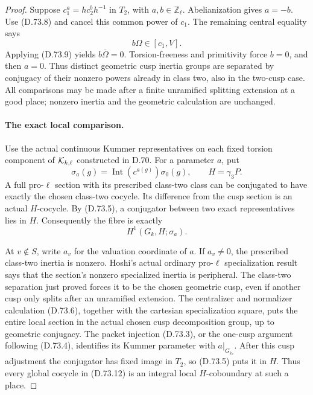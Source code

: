 \begin{proof}
Suppose \(c_1^a=h c_2^b h^{-1}\) in
\(T_2\), with \(a,b\in\mathbb Z_\ell\).
Abelianization gives \(a=-b\).
Use (D.73.8) and cancel this common
power of \(c_1\). The remaining
central equality says
\[
                        b\Omega\in[c_1,V].            \tag{D.73.10}
\]
Applying (D.73.9) yields \(b\overline\Omega=0\).
Torsion-freeness and primitivity force
\(b=0\), and then \(a=0\).
Thus distinct geometric cusp inertia
groups are separated by conjugacy
of their nonzero powers already in
class two, also in the two-cusp case.
All comparisons may be made after a
finite unramified splitting extension
at a good place; nonzero inertia and
the geometric calculation are unchanged.

\paragraph{The exact local comparison.}
Use the actual continuous Kummer
representatives on each fixed torsion
component of \({\cal K}_{k,\ell}\)
constructed in D.70. For a parameter
\(a\), put
\[
 \sigma_a(g)=\operatorname{Int}(c^{a(g)})\sigma_0(g),
                      \qquad H=\gamma_3P.              \tag{D.73.11}
\]
A full pro-\(\ell\) section with its
prescribed class-two class can be
conjugated to have exactly the chosen
class-two cocycle. Its difference
from the cusp section is an actual
\(H\)-cocycle. By (D.73.5), a
conjugator between two exact
representatives lies in \(H\).
Consequently the fibre is exactly
\[
                         H^1(G_k,H;\sigma_a).          \tag{D.73.12}
\]

At \(v\notin S\), write \(a_v\) for
the valuation coordinate of \(a\).
If \(a_v\ne0\), the prescribed
class-two inertia is nonzero.
Hoshi's actual ordinary pro-\(\ell\)
specialization result
\cite[Appendix A, A.3, Remark A.3.1 and Proposition A.6]
{DE_Hoshi2012}
says that the section's nonzero
specialized inertia is peripheral.
The class-two separation just proved
forces it to be the chosen geometric
cusp, even if another cusp only
splits after an unramified extension.
The centralizer and normalizer
calculation (D.73.6), together with
the cartesian specialization square,
puts the entire local section in the
actual chosen cusp decomposition
group, up to geometric conjugacy.
The packet injection (D.73.3), or
the one-cusp argument following
(D.73.4), identifies its Kummer
parameter with \(a|_{G_{k_v}}\).
After this cusp adjustment the
conjugator has fixed image in
\(T_2\), so (D.73.5) puts it in
\(H\). Thus every global cocycle
in (D.73.12) is an integral local
\(H\)-coboundary at such a place.


\end{proof}

